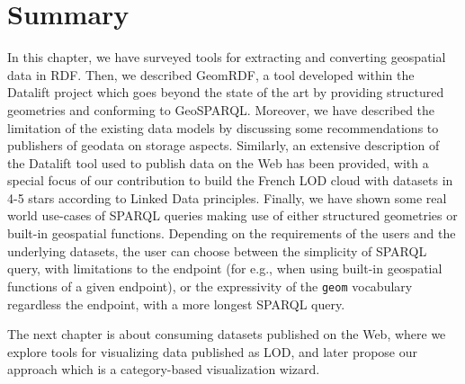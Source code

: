 \section{Summary}
\label{sec:ch2-summary}
In this chapter, we have surveyed tools for extracting and converting geospatial data in RDF. Then, we described GeomRDF, a tool developed within the Datalift project which goes beyond the state of the art by providing structured geometries and conforming to GeoSPARQL. Moreover, we have described the limitation of the existing data models by discussing some recommendations to publishers of geodata on storage aspects. Similarly, an extensive description of the Datalift tool used to publish data on the Web has been provided, with a special focus of our contribution to build the French LOD cloud with datasets in 4-5 stars according to Linked Data principles. Finally, we have shown some real world use-cases of SPARQL queries making use of either structured geometries or built-in geospatial functions. Depending on the requirements of the users and the underlying datasets, the user can choose between the simplicity of SPARQL query, with limitations to the endpoint (for e.g., when using built-in geospatial functions of a given endpoint), or the expressivity of the \texttt{geom} vocabulary regardless the endpoint, with a more longest SPARQL query.

The next chapter is about consuming datasets published on the Web, where we explore tools for visualizing data published as LOD, and later propose our approach which is a category-based visualization wizard.
